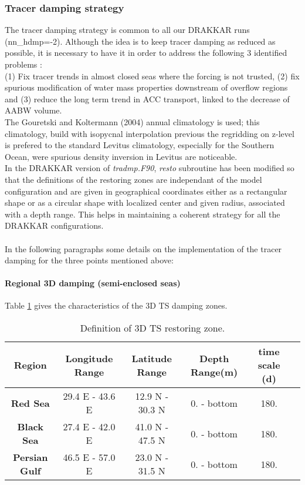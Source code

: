 \subsubsection{Tracer damping strategy}

The tracer damping strategy is common to all our DRAKKAR runs (nn\_hdmp=-2). Although the idea is to keep tracer damping as reduced as possible, 
it is necessary to have it in order to address the following 3 identified problems : \\
(1) Fix tracer trends in almost closed seas where the forcing is not trusted,
(2) fix spurious modification of water mass properties downstream of overflow regions and 
(3) reduce the long term trend in ACC transport, linked to the decrease of AABW volume.  \\
The Gouretski and Koltermann (2004) annual climatology is used; this climatology, build with isopycnal interpolation previous the regridding on z-level is
prefered to the standard Levitus climatology, especially for the Southern Ocean, were spurious density inversion in Levitus are noticeable. \\
In the DRAKKAR version of \textit{tradmp.F90}, \textit{resto} subroutine has been modified so that the definitions of the restoring zones are independant of
the model configuration and are given in geographical coordinates either as a rectangular shape or as a circular shape with localized center and given radius,
associated with a depth range.
This helps in maintaining a coherent strategy for all the DRAKKAR configurations. \\
\\
In the following paragraphs some details on the implementation of the tracer damping for the three points mentioned above:\\

\paragraph{Regional 3D damping (semi-enclosed seas) \\}

Table  \ref{table3Ddmp} gives the characteristics of the 3D TS damping zones.

\begin{table}[h]
\begin{center}
\begin{tabular}{|c|c|c|c|c|c|}
\hline
\textbf{Region} & \textbf{Longitude Range} & \textbf{Latitude Range}  & \textbf{Depth Range(m)}  & \textbf{ time scale (d)} \\
\hline
\textbf{Red Sea}         & 29.4 E - 43.6 E & 12.9 N - 30.3 N          &  0. - bottom             & 180.     \\
\textbf{Black Sea}       & 27.4 E - 42.0 E & 41.0 N - 47.5 N          &  0. - bottom             & 180.     \\
\textbf{Persian Gulf}    & 46.5 E - 57.0 E & 23.0 N - 31.5 N          &  0. - bottom             & 180.      \\
\hline
\end{tabular}
\label{table3Ddmp}
\caption{ Definition of 3D TS restoring zone.}
\end{center}
\end{table}

